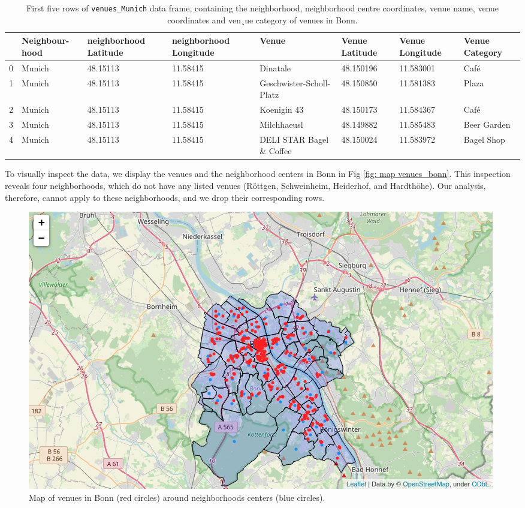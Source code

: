 \documentclass[UKenglish]{scrreprt}
\begin{document}
\begin{table}
	\caption{First five rows of \texttt{venues\_Munich} data frame, containing the neighborhood, neighborhood centre coordinates, venue name, venue coordinates and ven¸ue category of venues in Bonn.}
	\label{tab:venues_Munich}
\begin{tabular}{lp{1.5cm}p{2.2cm}p{2.2cm}p{1.5cm}p{1.5cm}p{1.5cm}p{1.5cm}}
	\toprule
	{} & Neighbour-hood & neighborhood Latitude &  neighborhood Longitude &                     Venue &  Venue Latitude &  Venue Longitude & Venue Category \\
	\midrule
	0 &       Munich &               48.15113 &                11.58415 &                  Dinatale &       48.150196 &        11.583001 &           Café \\
	1 &       Munich &               48.15113 &                11.58415 &  Geschwister-Scholl-Platz &       48.150850 &        11.581383 &          Plaza \\
	2 &       Munich &               48.15113 &                11.58415 &               Koenigin 43 &       48.150173 &        11.584367 &           Café \\
	3 &       Munich &               48.15113 &                11.58415 &               Milchhaeusl &       48.149882 &        11.585483 &    Beer Garden \\
	4 &       Munich &               48.15113 &                11.58415 &  DELI STAR Bagel \& Coffee &       48.150024 &        11.583972 &     Bagel Shop \\
	\bottomrule
\end{tabular}
\end{table}

To visually inspect the data, we display the venues and the neighborhood centers in Bonn in Fig \ref{fig: map venues_bonn}. This inspection reveals four neighborhoods, which do not have any listed venues (Röttgen, Schweinheim, Heiderhof, and Hardthöhe). Our analysis, therefore, cannot apply to these neighborhoods, and we drop their corresponding rows.

\begin{figure}[htbp]
	\centering
	\includegraphics[width=\textwidth]{Figs/Map_Bonn_venues.png}
	\caption{Map of venues in Bonn (red circles) around neighborhoods centers (blue circles).}
	\label{fig:map venues_bonn}
\end{figure}
\end{document}
